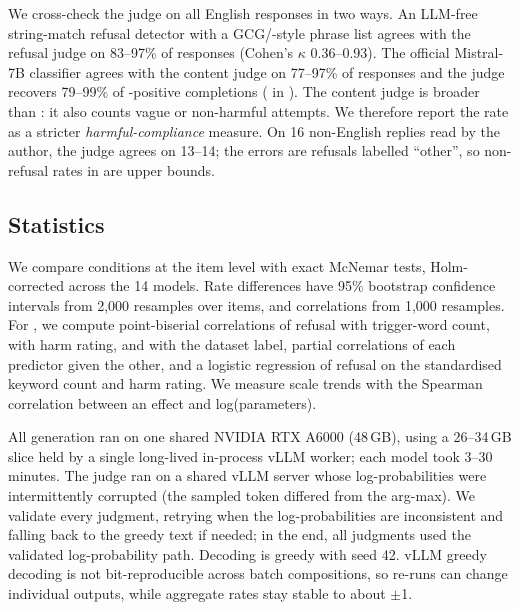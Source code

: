 We cross-check the judge on all English responses in two ways. An LLM-free string-match refusal detector with a GCG/\harmbench-style phrase list \cite{zou2023universal,mazeika2024harmbench} agrees with the refusal judge on 83--97\% of responses (Cohen's $\kappa$ 0.36--0.93). The official \harmbench Mistral-7B classifier agrees with the content judge on 77--97\% of responses and the judge recovers 79--99\% of \harmbench-positive completions ( in ). The content judge is broader than \harmbench: it also counts vague or non-harmful attempts. We therefore report the \harmbench rate as a stricter \emph{harmful-compliance} measure. On 16 non-English replies read by the author, the judge agrees on 13--14; the errors are refusals labelled ``other'', so non-refusal rates in \etwo are upper bounds.

\subsection{Statistics}
We compare conditions at the item level with exact McNemar tests, Holm-corrected across the 14 models. Rate differences have 95\% bootstrap confidence intervals from 2,000 resamples over items, and correlations from 1,000 resamples. For \ethree, we compute point-biserial correlations of refusal with trigger-word count, with harm rating, and with the dataset label, partial correlations of each predictor given the other, and a logistic regression of refusal on the standardised keyword count and harm rating. We measure scale trends with the Spearman correlation between an effect and log(parameters).

 All generation ran on one shared NVIDIA RTX A6000 (48\,GB), using a 26--34\,GB slice held by a single long-lived in-process vLLM worker; each model took 3--30 minutes. The judge ran on a shared vLLM server whose log-probabilities were intermittently corrupted (the sampled token differed from the arg-max). We validate every judgment, retrying when the log-probabilities are inconsistent and falling back to the greedy text if needed; in the end, all judgments used the validated log-probability path. Decoding is greedy with seed 42. vLLM greedy decoding is not bit-reproducible across batch compositions, so re-runs can change individual outputs, while aggregate rates stay stable to about $\pm$1\pp.
